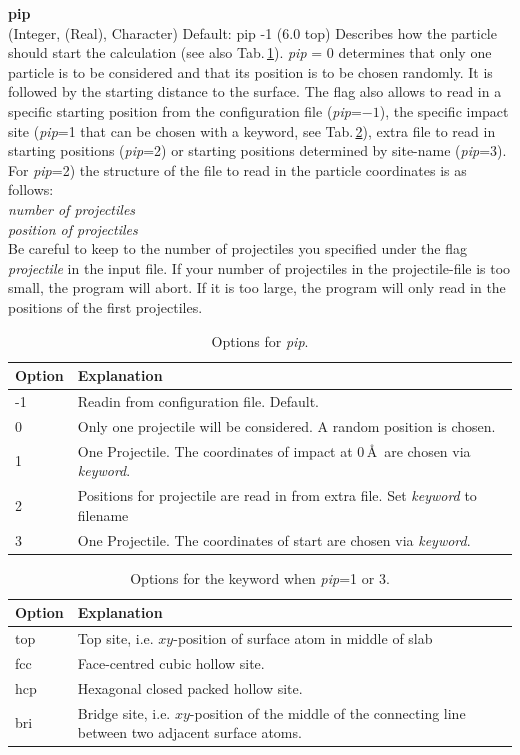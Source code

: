 \documentclass[twoside, 11pt, titlepage, captions=nooneline, a4paper, headsepline]{scrbook}%
\newcommand{\9}{\mathrm}
\newcommand{\0}{\,\mathrm}
\begin{document}
\noindent\textbf{pip}\\
(Integer, (Real), Character)
Default: pip -1 (6.0 top)
Describes how the particle should start the calculation (see also Tab.\,\ref{Tab:mxt:pip}). \textit{pip} = 0 determines that only one particle is to be considered and that its position is to be chosen randomly. It is followed by the starting distance to the surface. The flag also allows to read in a specific starting position from the configuration file (\textit{pip}=$-1$), the specific impact site (\textit{pip}=1 that can be chosen with a keyword, see Tab.\,\ref{Tab:mxt:pip_keyword}), extra file to read in starting positions (\textit{pip}=2) or starting positions determined by site-name (\textit{pip}=3). For \textit{pip}=2) the structure of the file to read in the particle coordinates is as follows:\\
\emph{number of projectiles}\\
\emph{position of projectiles}\\
Be careful to keep to the number of projectiles you specified under the flag \emph{projectile} in the input file. If your number of projectiles in the projectile-file is too small, the program will abort. If it is too large, the program will only read in the positions of the first projectiles.\\

\begin{table}[t!]
\centering
\caption{Options for \emph{pip}.}
\label{Tab:mxt:pip}
\begin{tabular}{p{2cm}p{11cm}}
\hline\hline
Option&Explanation\\
\hline
-1 & Readin from configuration file. Default.\\
0 & Only one projectile will be considered. A random position is chosen. \\
1 & One Projectile. The coordinates of impact at 0\,\AA~are chosen via \emph{keyword}.\\
2 & Positions for projectile are read in from extra file. Set \emph{keyword} to filename\\
3 & One Projectile. The coordinates of start are chosen via \emph{keyword}.\\ 
\hline
\end{tabular}
\end{table}
\begin{table}[b!]
\centering
\caption{Options for the keyword when \emph{pip}=1 or 3.}
\label{Tab:mxt:pip_keyword}
\begin{tabular}{p{2cm}p{11cm}}
\hline\hline
Option&Explanation\\
\hline
top& Top site, i.e. $xy$-position of surface atom in middle of slab\\
fcc& Face-centred cubic hollow site.\\
hcp& Hexagonal closed packed hollow site.\\
bri& Bridge site, i.e. $xy$-position of the middle of the connecting line between two adjacent surface atoms.\\
\hline
\end{tabular}
\end{table}
\end{document}
